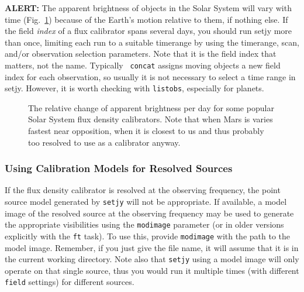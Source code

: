 {\bf ALERT:} The apparent brightness of objects in the Solar System
will vary with time (Fig.~\ref{fig:reldelfdperday}) because of the
Earth's motion relative to them, if nothing else.  If the field {\it
  index} of a flux calibrator spans several days, you should run setjy
more than once, limiting each run to a suitable timerange by using the
timerange, scan, and/or observation selection parameters.  Note that
it is the field index that matters, not the name.  Typically {\tt
  concat} assigns moving objects a new field index for each
observation, so usually it is not necessary to select a time range in
setjy.  However, it is worth checking with {\tt listobs}, especially
for planets.

\begin{figure}
\label{fig:reldelfdperday}
\caption{The relative change of apparent brightness per day for some
popular Solar System flux density calibrators.  Note that when Mars is
varies fastest near opposition, when it is closest to us and thus probably
too resolved to use as a calibrator anyway.}  
\end{figure}


\subsubsection{Using Calibration Models for Resolved Sources}
\label{section:cal.prior.models.resolved}

If the flux density calibrator is resolved at the observing frequency,
the point source model generated by {\tt setjy} will not be
appropriate.  If available, a model image of the resolved source at
the observing frequency may be used to generate the appropriate
visibilities using the {\tt modimage} parameter (or in older
versions explicitly with the {\tt ft} task).  To use this, provide
{\tt modimage} with the path to the model image.  Remember, if you
just give the file name, it will assume that it is in the
current working directory.  Note also that {\tt setjy} using a 
model image will only operate on that single source, thus you
would run it multiple times (with different {\tt field} settings)
for different sources.

